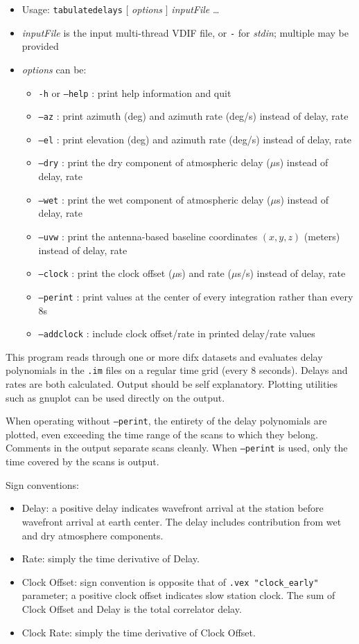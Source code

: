 \begin{itemize}
\item[] Usage: {\tt tabulatedelays} $ [ $ {\em options} $ ] $ {\em inputFile} \ldots
\item[] {\em inputFile} is the input multi-thread VDIF file, or {\tt -} for {\em stdin}; multiple may be provided
\item[] {\em options} can be:
\begin{itemize}
\item[] {\tt -h} or {\tt --help} : print help information and quit
\item[] {\tt --az} : print azimuth (deg) and azimuth rate (deg/s) instead of delay, rate
\item[] {\tt --el} : print elevation (deg) and azimuth rate (deg/s) instead of delay, rate
\item[] {\tt --dry} : print the dry component of atmospheric delay ($\mu$s) instead of delay, rate
\item[] {\tt --wet} : print the wet component of atmospheric delay ($\mu$s) instead of delay, rate
\item[] {\tt --uvw} : print the antenna-based baseline coordinates $(x, y, z)$ (meters) instead of delay, rate
\item[] {\tt --clock} : print the clock offset ($\mu$s) and rate ($\mu$s/s) instead of delay, rate
\item[] {\tt --perint} : print values at the center of every integration rather than every 8s
\item[] {\tt --addclock} : include clock offset/rate in printed delay/rate values
\end{itemize}
\end{itemize}

This program reads through one or more difx datasets and evaluates delay polynomials in the {\tt .im} files on a regular time grid (every 8 seconds).
Delays and rates are both calculated.
Output should be self explanatory.
Plotting utilities such as gnuplot can be used directly on the output.

When operating without {\tt --perint}, the entirety of the delay polynomials are plotted, even exceeding the time range of the scans to which they belong.
Comments in the output separate scans cleanly.
When {\tt --perint} is used, only the time covered by the scans is output.

Sign conventions:
\begin{itemize}
  \item Delay: a positive delay indicates wavefront arrival at the station before wavefront arrival at earth center.
	The delay includes contribution from wet and dry atmosphere components.
  \item Rate: simply the time derivative of Delay.
  \item Clock Offset: sign convention is opposite that of {\tt .vex "clock\_early"} parameter; a positive clock offset indicates slow station clock.
	The sum of Clock Offset and Delay is the total correlator delay.
  \item Clock Rate: simply the time derivative of Clock Offset.
\end{itemize}


